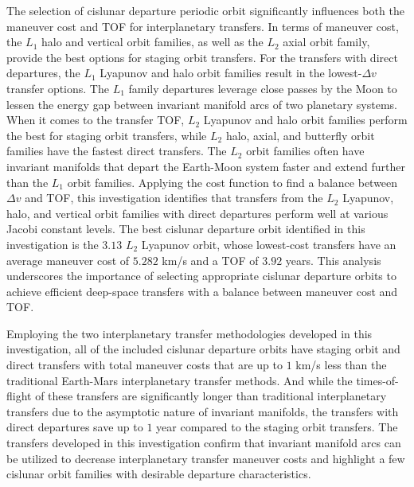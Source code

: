 The selection of cislunar departure periodic orbit significantly influences both the maneuver cost
and TOF for interplanetary transfers. In terms of maneuver cost, the $L_{1}$ halo and vertical
orbit families, as well as the $L_{2}$ axial orbit family, provide the best options for staging
orbit transfers. For the transfers with direct departures, the $L_{1}$ Lyapunov and halo orbit
families result in the lowest-$\Delta v$ transfer options. The $L_{1}$ family departures leverage
close passes by the Moon to lessen the energy gap between invariant manifold arcs of two planetary
systems. When it comes to the transfer TOF, $L_{2}$ Lyapunov and halo orbit families perform the
best for staging orbit transfers, while $L_{2}$ halo, axial, and butterfly orbit families have the
fastest direct transfers. The $L_{2}$ orbit families often have invariant manifolds that depart the
Earth-Moon system faster and extend further than the $L_{1}$ orbit families. Applying the cost
function to find a balance between $\Delta v$ and TOF, this investigation identifies that transfers
from the $L_{2}$ Lyapunov, halo, and vertical orbit families with direct departures perform well at
various Jacobi constant levels. The best cislunar departure orbit identified in this investigation
is the $3.13$ $L_{2}$ Lyapunov orbit, whose lowest-cost transfers have an average maneuver cost of
$5.282$ km/s and a TOF of $3.92$ years. This analysis underscores the importance of selecting
appropriate cislunar departure orbits to achieve efficient deep-space transfers with a balance
between maneuver cost and TOF.

Employing the two interplanetary transfer methodologies developed in this investigation, all of the
included cislunar departure orbits have staging orbit and direct transfers with total maneuver
costs that are up to $1$ km/s less than the traditional Earth-Mars interplanetary transfer methods.
And while the times-of-flight of these transfers are significantly longer than traditional
interplanetary transfers due to the asymptotic nature of invariant manifolds, the transfers with
direct departures save up to $1$ year compared to the staging orbit transfers. The transfers
developed in this investigation confirm that invariant manifold arcs can be utilized to decrease
interplanetary transfer maneuver costs and highlight a few cislunar orbit families with desirable
departure characteristics.

